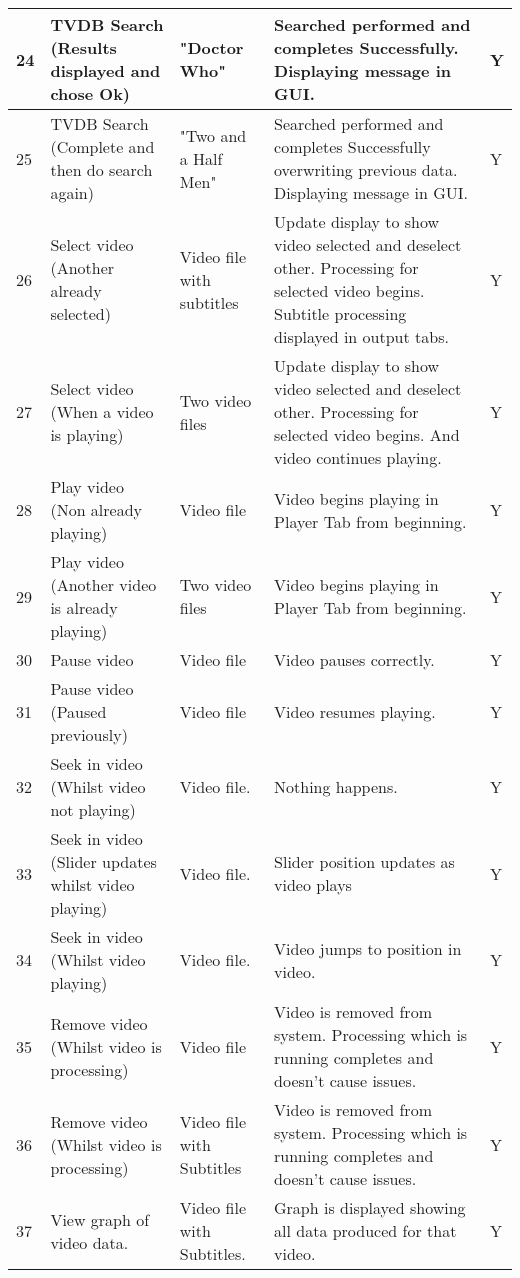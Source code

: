 \begin{center}
\begin{longtable}{| p{18pt} | p{100pt}| p{100pt}| p{110pt} | p{46pt} |}
\\\hline	
24	&TVDB Search (Results displayed and chose Ok)						&"Doctor Who"			&Searched performed and completes Successfully. Displaying message in GUI.	&Y
\\\hline	
25	&TVDB Search (Complete and then do search again)						&"Two and a Half Men"		&Searched performed and completes Successfully overwriting previous data. Displaying message in GUI.	&Y	
\\\hline
26	&Select video (Another already selected)								&Video file with subtitles	&Update display to show video selected and deselect other. Processing for selected video begins. Subtitle processing displayed in output tabs.	&Y	
\\\hline	
27	&Select video (When a video is playing)								&Two video files			&Update display to show video selected and deselect other. Processing for selected video begins. And video continues playing.	&Y
\\\hline						
28	&Play video (Non already playing)									&Video file				&Video begins playing in Player Tab from beginning.&Y			
\\\hline	
29	&Play video (Another video is already playing)							&Two video files			&Video begins playing in Player Tab from beginning.&Y				
\\\hline					
30	&Pause video												&Video file				&Video pauses correctly.					&Y				
\\\hline	
31	&Pause video (Paused previously)									&Video file				&Video resumes playing.					&Y				
\\\hline						
32	&Seek in video (Whilst video not playing)							&Video file.			&Nothing happens.						&Y			
\\\hline	
33	&Seek in video (Slider updates whilst video playing)						&Video file.			&Slider position updates as video plays			&Y			
\\\hline	
34	&Seek in video (Whilst video playing)								&Video file.			&Video jumps to position in video.			&Y			
\\\hline						
35	&Remove video (Whilst video is processing)							&Video file				&Video is removed from system. Processing which is running completes and doesn't cause issues.	&Y
\\\hline	
36	&Remove video (Whilst video is processing)							&Video file with Subtitles	&Video is removed from system. Processing which is running completes and doesn't cause issues.	&Y
\\\hline						
37	&View graph of video data.	&Video file with Subtitles.					&Graph is displayed showing all data produced for that video.				&Y				

\end{longtable}
\end{center}
